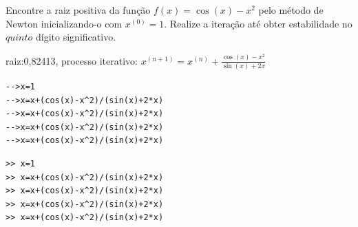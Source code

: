 \begin{exer}\label{1d:cosx2}
Encontre a raiz positiva da função $f(x)=\cos(x)-x^2$ pelo método de Newton inicializando-o com $x^{(0)}=1$. Realize a iteração até obter estabilidade no $quinto$ dígito significativo.
\end{exer}
\begin{resp}
  raiz:0,82413, processo iterativo: $x^{(n+1)}= x^{(n)}+ \frac{\cos(x)-x^2}{\sin(x)+2x}$

\ifisscilab
\begin{verbatim}
-->x=1
-->x=x+(cos(x)-x^2)/(sin(x)+2*x)
-->x=x+(cos(x)-x^2)/(sin(x)+2*x)
-->x=x+(cos(x)-x^2)/(sin(x)+2*x)
-->x=x+(cos(x)-x^2)/(sin(x)+2*x)
\end{verbatim}
\fi
\ifisoctave
\begin{verbatim}
>> x=1
>> x=x+(cos(x)-x^2)/(sin(x)+2*x)
>> x=x+(cos(x)-x^2)/(sin(x)+2*x)
>> x=x+(cos(x)-x^2)/(sin(x)+2*x)
>> x=x+(cos(x)-x^2)/(sin(x)+2*x)
\end{verbatim}
\fi
\end{resp}

